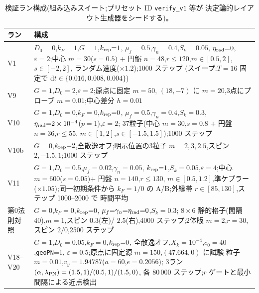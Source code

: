 \documentclass[a4paper,10pt,twocolumn]{ltjsarticle}
\newcommand{\ud}{\mathrm{d}}
\newcommand{\Kt}{X_k}
\newcommand{\Dz}{D_0}
\begin{document}
\begin{table}[h]
\caption{\label{tab:vconfig}%
検証ラン構成(組み込みスイート;プリセット ID \texttt{verify\_v1} 等が
決定論的レイアウト生成器をシードする)。}
\centering
\small
\setlength{\tabcolsep}{4pt}%
\begin{tabular}{p{}p{}}
\toprule
ラン & 構成 \\
\midrule
V1 & $\Dz{=}0$,$k_F{=}1$,$G{=}1$,$k_{\rm rep}{=}1$,
$\mu_f{=}0.5$,$\gamma_n{=}0.4$,$S_k{=}0.05$,
$\eta_{\rm rad}{=}0$,$\varepsilon{=}2$;中心 $m{=}30$($s{=}0.5$)
$+$ 円盤 $n{=}48$,$r{\le}120$,$m\in[0.5,2]$,$s\in[-2,2]$,
ランダム速度($\times1.2$);1000 ステップ
(スイープ:$T{=}16$ 固定で $\ud t \in \{0.016,0.008,0.004\}$) \\
V9 & $G{=}1$,$\Dz{=}2$,$\varepsilon{=}2$;原点に固定 $m{=}50$,
$(18,-7)$ に $m{=}20$,3点にプローブ $m{=}0.01$;中心差分
$h{=}0.01$ \\
V10 & $G{=}1$,$\Dz{=}0$,$k_F{=}0$,$k_{\rm rep}{=}0$,
$\mu_f{=}0.5$,$\gamma_n{=}0.4$,$S_k{=}0.3$,
$\eta_{\rm rad}{=}2\times10^{-4}$($p{=}1$),$\varepsilon{=}2$;
37粒子(中心 $m{=}30$,$s{=}0.8$ $+$ 円盤 $n{=}36$,$r{\le}55$,
$m\in[1,2]$,$s\in[-1.5,1.5]$);1000 ステップ \\
V10b & $G{=}0$,$k_{\rm rep}{=}2$,全散逸オフ;明示位置の3粒子
$m{=}2,3,2.5$,スピン $2,-1.5,1$;1000 ステップ \\
V11 & $G{=}1$,$\Dz{=}0.5$,$\mu_f{=}0.02$,$\gamma_n{=}0.05$,
$k_{\rm rep}{=}1$,$S_k{=}0.05$,$\varepsilon{=}4$;中心
$m{=}600$($s{=}0.05$)$+$ 円盤 $n{=}140$,$r{\le}130$,
$m\in[0.5,1.2]$,準ケプラー($\times1.05$);同一初期条件から
$k_F{=}1/0$ の A/B;外縁帯 $r\in[85,130]$,ステップ 1000--2000 で
時間平均 \\
第0法則対照 & $G{=}0$,$k_F{=}0$,$k_{\rm rep}{=}0$,
$\mu_f{=}\gamma_n{=}\eta_{\rm rad}{=}0$,$S_k{=}0.3$;
$8\times6$ 静的格子(間隔 40),$m{=}1$,スピン $0.3$(左)/
$2.5$(右),4000 ステップ;2体版 $m{=}2$,$r{=}30$,スピン
$2/0$,2500 ステップ \\
V18--V20 & $G{=}1$,$\Dz{=}0.05$,$k_F{=}0$,$k_{\rm rep}{=}0$,
全散逸オフ,$\Kt{=}10^{-4}$,$c_0{=}40$,\texttt{geoPN}{=}1,
$\varepsilon{=}0.5$;原点に固定源 $m{=}150$,$(47.664,0)$ に試験
粒子 $m{=}0.01$,$v_y{=}1.94787$($a{=}60$,$e{=}0.2056$);
3ラン $(\alpha,\lambda_{\rm PN}) = (1.5,1)/(0.5,1)/(1.5,0)$,
各 80\,000 ステップ;$r$ ゲートと最小間隔による近点検出 \\
\bottomrule
\end{tabular}
\end{table}

\end{document}
